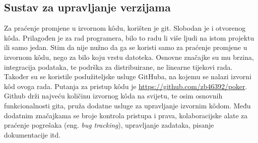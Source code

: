 \subsection{Sustav za upravljanje verzijama}
Za praćenje promjene u izvornom k\^odu, korišten je git. Slobodan je i otvorenog k\^oda. Prilagođen je za rad programera, bilo to radu li više ljudi na istom projektu ili samo jedan. Stim da nije nužno da ga se koristi samo za praćenje promjene u izvornom k\^odu, nego za bilo koju vrstu datoteka. Osnovne značajke su mu brzina, integracija podataka, te podrška za distribuirane, ne linearne tijekovi rada. Također su se koristile poslužiteljske usluge GitHuba, na kojemu se nalazi izvorni k\^od ovoga rada. Putanja za pristup k\^odu je \url{https://github.com/zb46392/poker}. Github drži najveću količinu izvornog k\^oda na svijetu, te osim osnovnih funkcionalnosti gita, pruža dodatne usluge za upravljanje izvornim k\^odom. Među dodatnim značajkama se broje kontrola pristupa i prava, kolaboracijske alate za praćenje pogrešaka (eng. \textit{bug tracking}), upravljanje zadataka, pisanje dokumentacije itd.